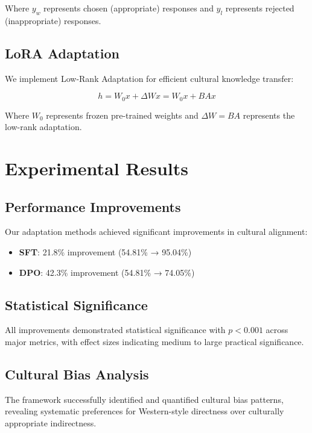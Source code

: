 \documentclass[11pt,twocolumn]{article}
\begin{document}
Where $y_w$ represents chosen (appropriate) responses and $y_l$ represents rejected (inappropriate) responses.

\subsection{LoRA Adaptation}

We implement Low-Rank Adaptation for efficient cultural knowledge transfer:

\begin{equation}
h = W_0x + \Delta Wx = W_0x + BAx
\end{equation}

Where $W_0$ represents frozen pre-trained weights and $\Delta W = BA$ represents the low-rank adaptation.

\section{Experimental Results}

\subsection{Performance Improvements}

Our adaptation methods achieved significant improvements in cultural alignment:

\begin{itemize}
    \item \textbf{SFT}: 21.8\% improvement (54.81\% → 95.04\%)
    \item \textbf{DPO}: 42.3\% improvement (54.81\% → 74.05\%)
\end{itemize}

\subsection{Statistical Significance}

All improvements demonstrated statistical significance with $p < 0.001$ across major metrics, with effect sizes indicating medium to large practical significance.

\subsection{Cultural Bias Analysis}

The framework successfully identified and quantified cultural bias patterns, revealing systematic preferences for Western-style directness over culturally appropriate indirectness.
\end{document}
